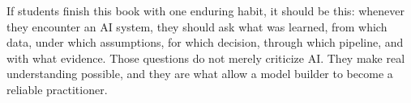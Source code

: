 If students finish this book with one enduring habit, it should be this: whenever they encounter an AI system, they should ask what was learned, from which data, under which assumptions, for which decision, through which pipeline, and with what evidence. Those questions do not merely criticize AI. They make real understanding possible, and they are what allow a model builder to become a reliable practitioner.
